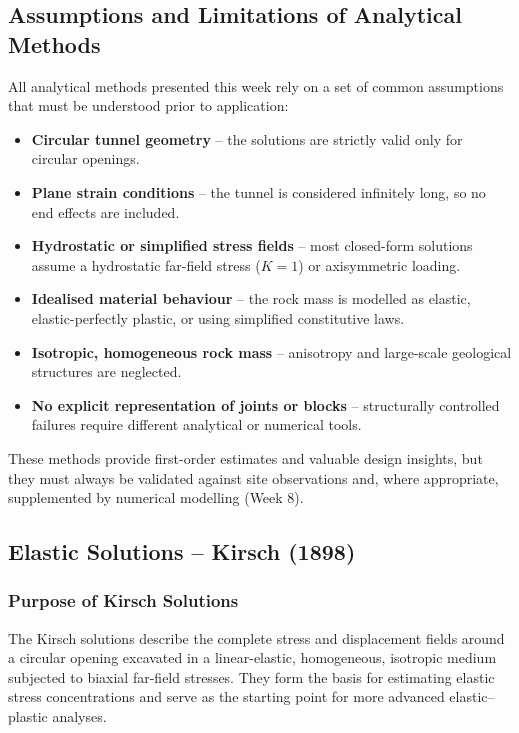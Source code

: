 \documentclass[a4paper,12pt]{article}
\begin{document}
\subsection{Assumptions and Limitations of Analytical Methods}
All analytical methods presented this week rely on a set of common assumptions that must be understood prior to application:

\begin{itemize}
    \item \textbf{Circular tunnel geometry} -- the solutions are strictly valid only for circular openings.
    \item \textbf{Plane strain conditions} -- the tunnel is considered infinitely long, so no end effects are included.
    \item \textbf{Hydrostatic or simplified stress fields} -- most closed-form solutions assume a hydrostatic far-field stress ($K=1$) or axisymmetric loading.
    \item \textbf{Idealised material behaviour} -- the rock mass is modelled as elastic, elastic-perfectly plastic, or using simplified constitutive laws.
    \item \textbf{Isotropic, homogeneous rock mass} -- anisotropy and large-scale geological structures are neglected.
    \item \textbf{No explicit representation of joints or blocks} -- structurally controlled failures require different analytical or numerical tools.
\end{itemize}

These methods provide first-order estimates and valuable design insights, but they must always be validated against site observations and, where appropriate, supplemented by numerical modelling (Week 8).

\subsection{Elastic Solutions -- Kirsch (1898)}

\subsubsection{Purpose of Kirsch Solutions}
The Kirsch solutions describe the complete stress and displacement fields around a circular opening excavated in a linear-elastic, homogeneous, isotropic medium subjected to biaxial far-field stresses. They form the basis for estimating elastic stress concentrations and serve as the starting point for more advanced elastic--plastic analyses.
\end{document}
